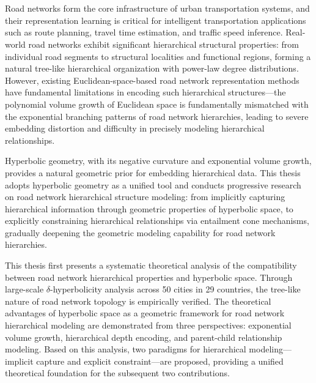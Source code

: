 \newpage
\vspace{-1cm}
\chapter*{}
\vspace{-0.5cm}

Road networks form the core infrastructure of urban transportation systems, and their representation learning is critical for intelligent transportation applications such as route planning, travel time estimation, and traffic speed inference. Real-world road networks exhibit significant hierarchical structural properties: from individual road segments to structural localities and functional regions, forming a natural tree-like hierarchical organization with power-law degree distributions. However, existing Euclidean-space-based road network representation methods have fundamental limitations in encoding such hierarchical structures---the polynomial volume growth of Euclidean space is fundamentally mismatched with the exponential branching patterns of road network hierarchies, leading to severe embedding distortion and difficulty in precisely modeling hierarchical relationships.

Hyperbolic geometry, with its negative curvature and exponential volume growth, provides a natural geometric prior for embedding hierarchical data. This thesis adopts hyperbolic geometry as a unified tool and conducts progressive research on road network hierarchical structure modeling: from implicitly capturing hierarchical information through geometric properties of hyperbolic space, to explicitly constraining hierarchical relationships via entailment cone mechanisms, gradually deepening the geometric modeling capability for road network hierarchies.

This thesis first presents a systematic theoretical analysis of the compatibility between road network hierarchical properties and hyperbolic space. Through large-scale $\delta$-hyperbolicity analysis across 50 cities in 29 countries, the tree-like nature of road network topology is empirically verified. The theoretical advantages of hyperbolic space as a geometric framework for road network hierarchical modeling are demonstrated from three perspectives: exponential volume growth, hierarchical depth encoding, and parent-child relationship modeling. Based on this analysis, two paradigms for hierarchical modeling---implicit capture and explicit constraint---are proposed, providing a unified theoretical foundation for the subsequent two contributions.

